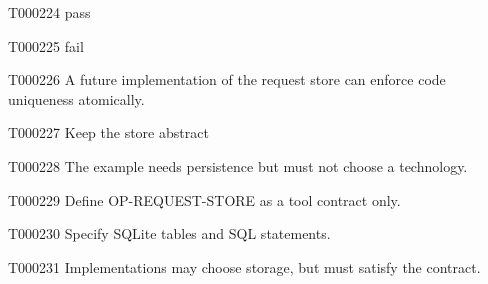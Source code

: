 \documentclass[11pt,a4paper]{article}
\begin{document}
\begin{atlasitem}{T000224}
pass
\end{atlasitem}
\begin{atlasitem}{T000225}
fail
\end{atlasitem}
\begin{atlasparagraph}{T000226}
A future implementation of the request store can enforce code uniqueness atomically.
\end{atlasparagraph}
\begin{atlastext}{T000227}
Keep the store abstract
\end{atlastext}
\begin{atlasparagraph}{T000228}
The example needs persistence but must not choose a technology.
\end{atlasparagraph}
\begin{atlasparagraph}{T000229}
Define OP-REQUEST-STORE as a tool contract only.
\end{atlasparagraph}
\begin{atlasparagraph}{T000230}
Specify SQLite tables and SQL statements.
\end{atlasparagraph}
\begin{atlasparagraph}{T000231}
Implementations may choose storage, but must satisfy the contract.
\end{atlasparagraph}
\end{document}
